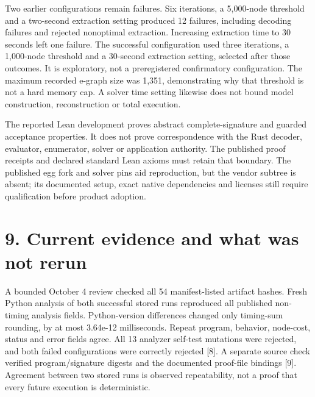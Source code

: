 \documentclass[11pt]{article}
\begin{document}
Two earlier configurations remain failures. Six iterations, a 5,000-node threshold and a two-second extraction setting produced 12 failures, including decoding failures and rejected nonoptimal extraction. Increasing extraction time to 30 seconds left one failure. The successful configuration used three iterations, a 1,000-node threshold and a 30-second extraction setting, selected after those outcomes. It is exploratory, not a preregistered confirmatory configuration. The maximum recorded e-graph size was 1,351, demonstrating why that threshold is not a hard memory cap. A solver time setting likewise does not bound model construction, reconstruction or total execution.

The reported Lean development proves abstract complete-signature and guarded acceptance properties. It does not prove correspondence with the Rust decoder, evaluator, enumerator, solver or application authority. The published proof receipts and declared standard Lean axioms must retain that boundary. The published egg fork and solver pins aid reproduction, but the vendor subtree is absent; its documented setup, exact native dependencies and licenses still require qualification before product adoption.

\section{9. Current evidence and what was not rerun}

A bounded October 4 review checked all 54 manifest-listed artifact hashes. Fresh Python analysis of both successful stored runs reproduced all published non-timing analysis fields. Python-version differences changed only timing-sum rounding, by at most 3.64e-12 milliseconds. Repeat program, behavior, node-cost, status and error fields agree. All 13 analyzer self-test mutations were rejected, and both failed configurations were correctly rejected [8]. A separate source check verified program/signature digests and the documented proof-file bindings [9]. Agreement between two stored runs is observed repeatability, not a proof that every future execution is deterministic.
\end{document}
